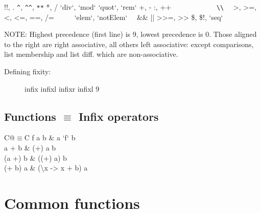 \documentclass{refcard}
\newcommand{\la}{\textbackslash}
\begin{document}
\begin{Ldesc}
	 !!, \hfill .
	 \hfill \verb+^+, \verb+^^+, \verb+**+
	 *, /
	 `div`, `mod`
	 `quot`, `rem`
	 +, -
	 \hfill :, ++
	                 ~~~~~~~~~~~~\verb+\\+
	\Li[comparisons:]     ~~>, >=, <, <=, ==, /=~~
	  ~~~`elem`, `notElem`~~
	 \hfill \&\&
	\Li[boolean or] \hfill ||
	 >>=, >>
	 \$, \$!, `seq`
\end{Ldesc}

\noindent
NOTE: Highest precedence (first line) is 9, lowest precedence is 0.  Those
aligned to the right are right associative, all others left associative: except
comparisons, list membership and list diff. which are non-associative.

\begin{description}
\item [Defining fixity:]
\begin{ldesc}
	 infix  
	 infixl  \I{+--+}
	 infixr  \I{-!-}
	 infixl 9
\end{ldesc}
\end{description}

\subsection{Functions $\equiv$ Infix operators}

\begin{tabular}{C@{\s$\equiv$\s}C}
	f a b & a `f` b \\
	a + b & (+) a b \\
	(a +) b & ((+) a) b \\
	(+ b) a & (\la{}x -> x + b) a \\
\end{tabular}


\section{Common functions}
\end{document}
